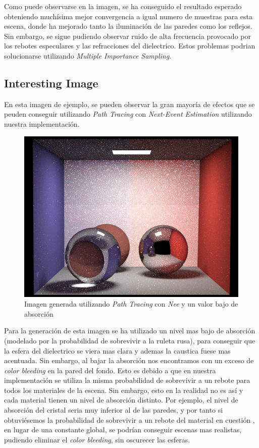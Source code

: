 \documentclass[10pt,oneside,a4paper]{article}
\begin{document}
Como puede observarse en la imagen, se ha conseguido el resultado esperado obteniendo muchísima mejor convergencia a igual numero de muestras para esta escena, donde ha mejorado tanto la iluminación de las paredes como los reflejos. Sin embargo, se sigue pudiendo observar ruido de alta frecuencia provocado por los rebotes especulares y las refracciones del dielectrico. Estos problemas podrian solucionarse utilizando \textit{Multiple Importance Sampling}.
 
 \subsection{Interesting Image}
En esta imagen de ejemplo, se pueden observar la gran mayoría de efectos que se peuden conseguir utilizando \textit{ Path Tracing} con \textit{Next-Event Estimation} utilizando nuestra implementación.

\begin{figure}[h]
\centering
\includegraphics[width=.6\linewidth]{images/cbox_interesting_nee_512.png}
\caption{Imagen generada utilizando \textit{Path Tracing} con \textit{Nee} y un valor bajo de absorción}
\label{fig:disp}
\end{figure}

Para la generación de esta imagen se ha utilizado un nivel mas bajo de absorción (modelado por la probabilidad de sobrevivir a la ruleta rusa), para conseguir que la esfera del dielectrico se viera mas clara y ademas la caustica fuese mas acentuada. Sin embargo, al bajar la absorción nos encontramos con un exceso de \textit{color bleeding} en la pared del fondo. Esto es debido a que en nuestra implementación se utiliza la misma probabilidad de sobrevivir a un rebote para todos los materiales de la escena. Sin embargo, esto en la realidad no es así y cada material tienen un nivel de absorción distinto. Por ejemplo, el nivel de absorción del cristal seria muy inferior al de las paredes, y por tanto si obtuviésemos la probabilidad de sobrevivir a un rebote del material en cuestión , en lugar de una constante global, se podrían conseguir escenas mas realistas, pudiendo eliminar el \textit{color bleeding}, sin oscurecer las esferas.   
  
\end{document}
